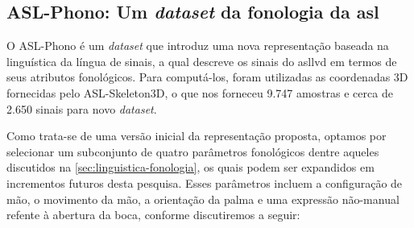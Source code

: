 \subsection{ASL-Phono: Um \textit{dataset} da fonologia da \acrshort{asl}}
\label{sec:metodologia-datasets-phono}

O ASL-Phono é um \textit{dataset} que introduz uma nova representação baseada na linguística da língua de sinais, a qual descreve os sinais do \acrshort{asllvd} em termos de seus atributos fonológicos. Para computá-los, foram utilizadas as coordenadas 3D fornecidas pelo ASL-Skeleton3D, o que nos forneceu 9.747 amostras e cerca de 2.650 sinais para novo \textit{dataset}.

Como trata-se de uma versão inicial da representação proposta, optamos por selecionar um subconjunto de quatro parâmetros fonológicos dentre aqueles discutidos na \autoref{sec:linguistica-fonologia}, os quais podem ser expandidos em incrementos futuros desta pesquisa. Esses parâmetros incluem a configuração de mão, o movimento da mão, a orientação da palma e uma expressão não-manual refente à abertura da boca, conforme discutiremos a seguir:

